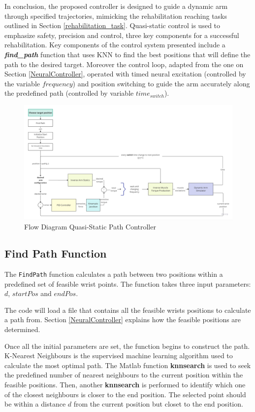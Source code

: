 In conclusion, the proposed controller is designed to guide a dynamic arm through specified trajectories, mimicking the rehabilitation reaching tasks outlined in Section \ref{rehabilitation_task}. Quasi-static control is used to emphasize safety, precision and control, three key components for a successful rehabilitation. Key components of the control system presented include a \textbf{\textit{find\_path} }function that uses KNN to find the best positions that will define the path to the desired target. Moreover the control loop, adapted from the one on Section \ref{NeuralController}, operated with timed neural excitation (controlled by the variable $frequency$) and position switching to guide the arm accurately along the predefined path (controlled by variable $time_{switch}$).


\begin{figure}[h!]
    \centering
    \includegraphics[width=1\textwidth]{Pictures/Controller/Quasi-Static Path Controller.jpg}
    \caption{Flow Diagram Quasi-Static Path Controller }
    \label{fig:PathController}
\end{figure}

\subsection{Find Path Function} \label{findpath}

The \texttt{FindPath} function calculates a path between two positions within a predefined set of feasible wrist points. The function takes three input parameters: $d$,  $startPos$ and $endPos$. 

The code will load a file that contains all the feasible wrists positions to calculate a path from. Section \ref{NeuralController} explains how the feasible positions are determined. 

Once all the initial parameters are set, the function begins to construct the path. K-Nearest Neighbours is the supervised machine learning algorithm used to calculate the most optimal path. The Matlab function \textbf{knnsearch} is used to seek the predefined number of nearest neighbours to the current position within the feasible positions. Then, another \textbf{knnsearch} is performed to identify which one of the closest neighbours is closer to the end position. The selected point should be within a distance $d$ from the current position but closet to the end position.

